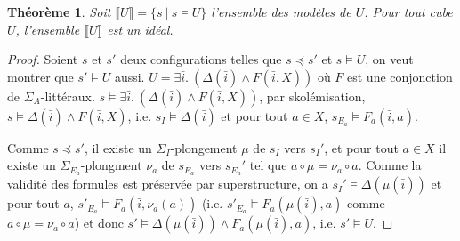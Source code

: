 \documentclass[a4paper, twoside]{scrartcl}
\theoremstyle{plain}%
\newtheorem{thm}{Théorème}[section]
\theoremstyle{definition}
\newtheorem{defn}{Définition}[section]
\theoremstyle{remark}
\begin{document}




\begin{thm} \label{cube_i}
  Soit $\llbracket U \rrbracket = \{ s ~|~ s \vDash U \}$ l'ensemble
  des modèles de $U$. Pour tout cube $U$, l'ensemble
  $\llbracket U \rrbracket$ est un idéal.
\end{thm}


\begin{proof}
  Soient $s$ et $s'$ deux configurations telles que $s \preceq s'$ et
  $s \vDash U$, on veut montrer que $s' \vDash U$ aussi. $U = \exists
  \bar i.~ (\Delta(\bar i) \land F(\bar i,X))$ où $F$ est une
  conjonction de $\Sigma_A$-littéraux.  $s \vDash \exists \bar i.~
  (\Delta(\bar i) \land F(\bar i,X))$, par skolémisation, $s \vDash
  \Delta(\bar i) \land F(\bar i,X)$, i.e. $s_I \vDash \Delta(\bar i)$
  et pour tout $a \in X$, $s_{E_a} \vDash F_a(\bar i,a)$.

  Comme $s \preceq s'$, il existe un $\Sigma_I$-plongement $\mu$ de
  $s_I$ vers $s_I'$, et pour tout $a \in X$ il existe un
  $\Sigma_{E_a}$-plongment $\nu_a$ de $s_{E_a}$ vers $s_{E_a}'$ tel
  que $a \circ \mu = \nu_a \circ a$.  Comme la validité des formules
  est préservée par superstructure, on a $s_I' \vDash \Delta(\mu(\bar
  i))$ et pour tout $a$, $s'_{E_a} \vDash F_a(\bar i, \nu_a(a))$
  (i.e. $s'_{E_a} \vDash F_a(\mu(\bar i), a)$ comme $a \circ \mu =
  \nu_a \circ a$) et donc $s' \vDash \Delta(\mu(\bar i)) \land
  F_a(\mu(\bar i), a)$, i.e. $s' \vDash U$.

\end{proof}
\end{document}
